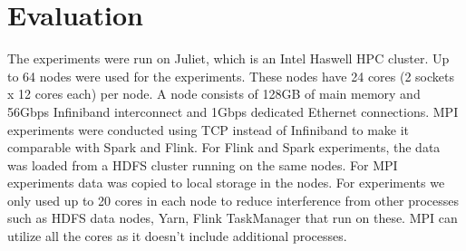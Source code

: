 \documentclass[conference]{IEEEtran}
\begin{document}
\section{Evaluation} \label{evaluation}

The experiments were run on Juliet, which is an Intel Haswell HPC cluster. Up to 64 nodes were used for the experiments. These nodes have 24 cores (2 sockets x 12 cores each) per node. A node consists of 128GB of main memory and 56Gbps Infiniband interconnect and 1Gbps dedicated Ethernet connections. MPI experiments were conducted using TCP instead of Infiniband to make it comparable with Spark and Flink. For Flink and Spark experiments, the data was loaded from a HDFS cluster running on the same nodes. For MPI experiments data was copied to local storage in the nodes. For experiments we only used up to 20 cores in each node to reduce interference from other processes such as HDFS data nodes, Yarn, Flink TaskManager that run on these. MPI can utilize all the cores as it doesn't include additional processes.
\end{document}
